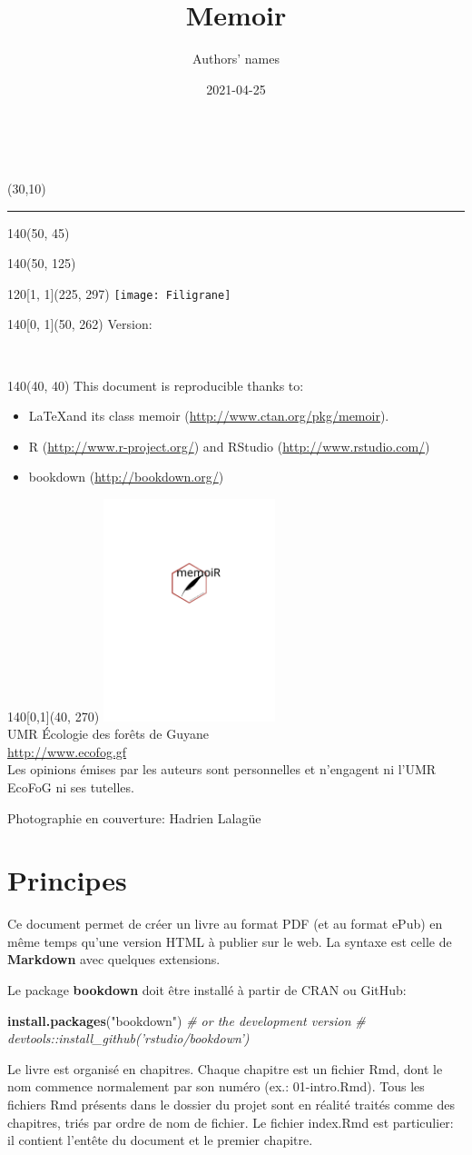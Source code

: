 \documentclass[
  11pt,
  american,
  a4paper,
  extrafontsizes,onecolumn,openright
  ]{memoir}
\title{Memoir}
\author{Authors' names}
\date{2021-04-25}
\newenvironment{Shaded}{\begin{snugshade}}{\end{snugshade}}
\newcommand{\CommentTok}[1]{\textcolor[rgb]{0.56,0.35,0.01}{\textit{#1}}}
\newcommand{\KeywordTok}[1]{\textcolor[rgb]{0.13,0.29,0.53}{\textbf{#1}}}
\newcommand{\NormalTok}[1]{#1}
\newcommand{\StringTok}[1]{\textcolor[rgb]{0.31,0.60,0.02}{#1}}
\newcommand{\MainTitlePage}[1][]{
	\SmallMargins %
	\pagestyle{empty} %
	~\\ %
	\begin{textblock}{2}(30,10)
		\rule{1pt}{\paperheight-20mm}
	\end{textblock}
	\begin{textblock}{140}(50, 45)
		\flushright
		\begin{Spacing}{3}
			{\fontfamily{qtm}\selectfont\fontsize{45}{45}\selectfont \textsc{\thetitle}}
		\end{Spacing}
	\end{textblock}
	\begin{textblock}{140}(50, 125)
		\flushright
		{\fontfamily{qtm}\Large \theauthor}
	\end{textblock}
	\begin{textblock}{120}[1, 1](225, 297)
		\texttt{[image: Filigrane]}
	 \end{textblock}
	\begin{textblock}{140}[0, 1](50, 262)
		\normalfont	Version: \thedate
	\end{textblock}
	\newpage
	~\\ %
	\begin{textblock}{140}(40, 40)
		#1
	\end{textblock}
	\begin{textblock}{140}[0,1](40, 270)
		\centering
    \includegraphics[width=5cm]{logo}\\ \bigskip
		UMR \'Ecologie des forêts de Guyane\\
		\url{http://www.ecofog.gf}\\[3\baselineskip]
		Les opinions émises par les auteurs sont personnelles et n'engagent ni l'UMR EcoFoG ni ses tutelles.

    \tiny{Photographie en couverture: Hadrien Lalagüe}
	\end{textblock}
	\newpage
}
\begin{document}
\frontmatter



\cleardoublepage

\MainTitlePage[This document is reproducible thanks to:

\begin{itemize}
  \item \LaTeX and its class memoir (\url{http://www.ctan.org/pkg/memoir}).
  \item R (\url{http://www.r-project.org/}) and RStudio (\url{http://www.rstudio.com/})
  \item bookdown (\url{http://bookdown.org/})
\end{itemize}]







\LargeMargins
{
\hypersetup{linkcolor=}
\setcounter{tocdepth}{3}
\tableofcontents
}



\LargeMargins
\hypertarget{principes}{%
\chapter*{Principes}\label{principes}}

Ce document permet de créer un livre au format PDF (et au format ePub) en même temps qu'une version HTML à publier sur le web.
La syntaxe est celle de \textbf{Markdown} avec quelques extensions.

Le package \textbf{bookdown} doit être installé à partir de CRAN ou GitHub:

\scriptsize

\begin{Shaded}
\begin{Highlighting}[]
\KeywordTok{install.packages}\NormalTok{(}\StringTok{"bookdown"}\NormalTok{)}
\CommentTok{# or the development version}
\CommentTok{# devtools::install_github('rstudio/bookdown')}
\end{Highlighting}
\end{Shaded}

\normalsize

Le livre est organisé en chapitres.
Chaque chapitre est un fichier Rmd, dont le nom commence normalement par son numéro (ex.: 01-intro.Rmd).
Tous les fichiers Rmd présents dans le dossier du projet sont en réalité traités comme des chapitres, triés par ordre de nom de fichier.
Le fichier index.Rmd est particulier: il contient l'entête du document et le premier chapitre.
\end{document}
